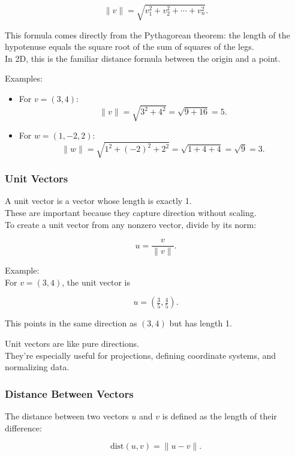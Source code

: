 \documentclass[
  letterpaper,
  DIV=11,
  numbers=noendperiod]{scrreprt}
\begin{document}
\[
\|v\| = \sqrt{v_1^2 + v_2^2 + \cdots + v_n^2}.
\]

This formula comes directly from the Pythagorean theorem: the length of
the hypotenuse equals the square root of the sum of squares of the
legs.\\
In 2D, this is the familiar distance formula between the origin and a
point.

Examples:

\begin{itemize}
\item
  For \(v = (3, 4)\):\\
  \[
  \|v\| = \sqrt{3^2 + 4^2} = \sqrt{9 + 16} = 5.
  \]
\item
  For \(w = (1, -2, 2)\):\\
  \[
  \|w\| = \sqrt{1^2 + (-2)^2 + 2^2} = \sqrt{1 + 4 + 4} = \sqrt{9} = 3.
  \]
\end{itemize}

\subsubsection{Unit Vectors}\label{unit-vectors}

A unit vector is a vector whose length is exactly 1.\\
These are important because they capture direction without scaling.\\
To create a unit vector from any nonzero vector, divide by its norm:

\[
u = \frac{v}{\|v\|}.
\]

Example:\\
For \(v = (3, 4)\), the unit vector is

\[
u = \left(\tfrac{3}{5}, \tfrac{4}{5}\right).
\]

This points in the same direction as \((3, 4)\) but has length 1.

Unit vectors are like pure directions.\\
They're especially useful for projections, defining coordinate systems,
and normalizing data.

\subsubsection{Distance Between Vectors}\label{distance-between-vectors}

The distance between two vectors \(u\) and \(v\) is defined as the
length of their difference:

\[
\text{dist}(u, v) = \|u - v\|.
\]
\end{document}

